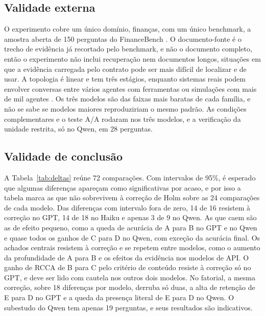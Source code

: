 \subsection{Validade externa}\label{sec:ameacas-externa}

O experimento cobre um único domínio, finanças, com um único benchmark, a amostra aberta de 150 perguntas do FinanceBench \cite{islam2023financebench}.
O documento-fonte é o trecho de evidência já recortado pelo benchmark, e não o documento completo, então o experimento não inclui recuperação nem documentos longos, situações em que a evidência carregada pelo contrato pode ser mais difícil de localizar e de usar.
A topologia é linear e tem três estágios, enquanto sistemas reais podem envolver conversas entre vários agentes com ferramentas \cite{wu2023autogen} ou simulações com mais de mil agentes \cite{altera2024sid}.
Os três modelos são das faixas mais baratas de cada família, e não se sabe se modelos maiores reproduziriam o mesmo padrão.
As condições complementares e o teste A/A rodaram nos três modelos, e a verificação da unidade restrita, só no Qwen, em 28 perguntas.

\subsection{Validade de conclusão}\label{sec:ameacas-conclusao}

A Tabela~\ref{tab:deltas} reúne 72 comparações.
Com intervalos de 95\%, é esperado que algumas diferenças apareçam como significativas por acaso, e por isso a tabela marca as que não sobrevivem à correção de Holm sobre as 24 comparações de cada modelo.
Das diferenças com intervalo fora de zero, 14 de 16 resistem à correção no GPT, 14 de 18 no Haiku e apenas 3 de 9 no Qwen. As que caem são as de efeito pequeno, como a queda de acurácia de A para B no GPT e no Qwen e quase todos os ganhos de C para D no Qwen, com exceção da acurácia final.
Os achados centrais resistem à correção e se repetem entre modelos, como o aumento da profundidade de A para B e os efeitos da evidência nos modelos de API.
O ganho de RCCA de B para C pelo critério de conteúdo resiste à correção só no GPT, e deve ser lido com cautela nos outros dois modelos.
No fatorial, a mesma correção, sobre 18 diferenças por modelo, derruba só duas, a alta de retenção de E para D no GPT e a queda da presença literal de E para D no Qwen.
O subestudo do Qwen tem apenas 19 perguntas, e seus resultados são indicativos.
